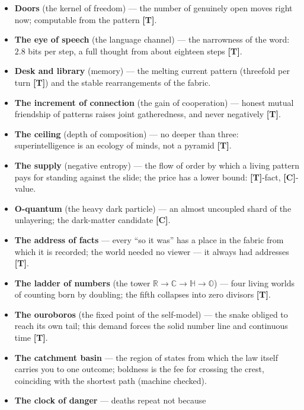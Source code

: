\documentclass[11pt,letterpaper]{article}
\newcommand{\stT}{\textbf{[T]}\xspace}
\newcommand{\stC}{\textbf{[C]}\xspace}
\begin{document}
\begin{itemize}[leftmargin=1.4em, itemsep=1pt, parsep=0pt]
    lawful step backwards: the world stands still, the state of
    knowledge moves; without it almost half of composable thoughts
    cannot be assembled \stC.
  \item \textbf{Doors} (the kernel of freedom) --- the number of
    genuinely open moves right now; computable from the pattern
    \stT.
  \item \textbf{The eye of speech} (the language channel) --- the
    narrowness of the word: $2.8$ bits per step, a full thought
    from about eighteen steps \stT.
  \item \textbf{Desk and library} (memory) --- the melting current
    pattern (threefold per turn \stT) and the stable rearrangements
    of the fabric.
  \item \textbf{The increment of connection} (the gain of
    cooperation) --- honest mutual friendship of patterns raises
    joint gatheredness, and never negatively \stT.
  \item \textbf{The ceiling} (depth of composition) --- no deeper
    than three: superintelligence is an ecology of minds, not a
    pyramid \stT.
  \item \textbf{The supply} (negative entropy) --- the flow of
    order by which a living pattern pays for standing against the
    slide; the price has a lower bound: \stT-fact, \stC-value.
  \item \textbf{O-quantum} (the heavy dark particle) --- an almost
    uncoupled shard of the unlayering; the dark-matter candidate
    \stC.
  \item \textbf{The address of facts} --- every ``so it was'' has a
    place in the fabric from which it is recorded; the world needed
    no viewer --- it always had addresses \stT.
  \item \textbf{The ladder of numbers} (the tower $\mathbb{R}{\to}
    \mathbb{C}{\to}\mathbb{H}{\to}\mathbb{O}$) --- four living
    worlds of counting born by doubling; the fifth collapses into
    zero divisors \stT.
  \item \textbf{The ouroboros} (the fixed point of the self-model)
    --- the snake obliged to reach its own tail; this demand forces
    the solid number line and continuous time \stT.
  \item \textbf{The catchment basin} --- the region of states from
    which the law itself carries you to one outcome; boldness is
    the fee for crossing the crest, coinciding with the shortest
    path (machine checked).
  \item \textbf{The clock of danger} --- deaths repeat not because

\end{itemize}
\end{document}
